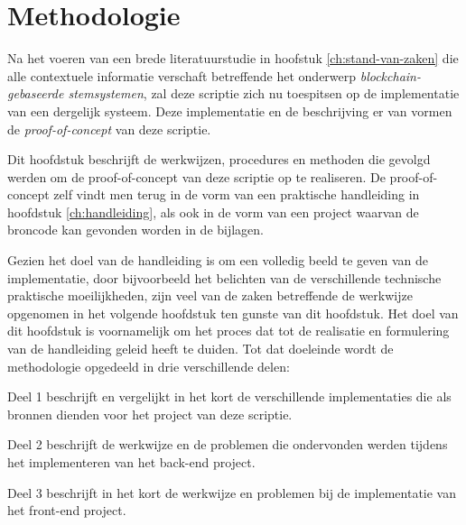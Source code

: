 
\chapter{Methodologie}
\label{ch:methodologie}

Na het voeren van een brede literatuurstudie in hoofstuk \ref{ch:stand-van-zaken} die  alle contextuele informatie verschaft betreffende het onderwerp \textit{blockchain-gebaseerde stemsystemen}, zal deze scriptie zich nu toespitsen op de implementatie van een dergelijk systeem. Deze implementatie en de beschrijving er van vormen de  \textit{proof-of-concept} van deze scriptie.

 Dit hoofdstuk beschrijft de werkwijzen, procedures en methoden die gevolgd werden om de  proof-of-concept van deze scriptie op te realiseren. De proof-of-concept zelf vindt men terug in de vorm van een praktische handleiding in hoofdstuk \ref{ch:handleiding}, als ook in de vorm van een project waarvan de broncode kan gevonden worden in de bijlagen.
 
 Gezien het doel van de handleiding is om een volledig beeld te geven van de implementatie, door bijvoorbeeld het belichten van de verschillende technische praktische moeilijkheden, zijn veel van de zaken betreffende de werkwijze opgenomen in het volgende hoofdstuk ten gunste van dit hoofdstuk. Het doel van dit hoofdstuk is voornamelijk om het proces dat tot de realisatie en formulering van de handleiding geleid heeft te duiden. Tot dat doeleinde wordt de methodologie opgedeeld in drie verschillende delen:

Deel 1 beschrijft en vergelijkt in het kort de verschillende implementaties die als bronnen dienden voor het project van deze scriptie.

Deel 2 beschrijft de werkwijze en de problemen die ondervonden werden tijdens het implementeren van het back-end project.

Deel 3 beschrijft in het kort de werkwijze en problemen bij de implementatie van het front-end project.

